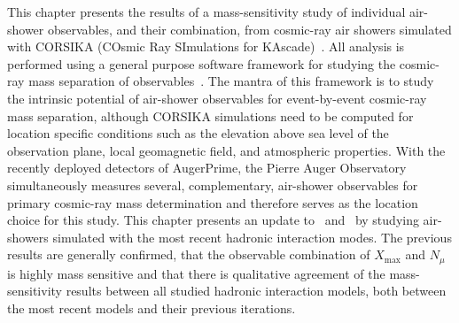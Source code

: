 This chapter presents the results of a mass-sensitivity study of individual air-shower observables, and their combination, from cosmic-ray air showers simulated with CORSIKA (COsmic Ray SImulations for KAscade)~\cite{heck_1998_corsika}.
All analysis is performed using a general purpose software framework for studying the cosmic-ray mass separation of observables~\cite{flaggs_masters2022,flaggs_prd2024_mso,isvhecri2026_flaggs_hadronicmodels}.
The mantra of this framework is to study the intrinsic potential of air-shower observables for event-by-event cosmic-ray mass separation, although CORSIKA simulations need to be computed for location specific conditions such as the elevation above sea level of the observation plane, local geomagnetic field, and atmospheric properties.
With the recently deployed detectors of AugerPrime, the Pierre Auger Observatory simultaneously measures several, complementary, air-shower observables for primary cosmic-ray mass determination and therefore serves as the location choice for this study.
This chapter presents an update to~\cite{flaggs_masters2022} and~\cite{flaggs_prd2024_mso} by studying air-showers simulated with the most recent hadronic interaction modes.
The previous results are generally confirmed, that the observable combination of $X_{\text{max}}$ and $N_{\mu}$ is highly mass sensitive and that there is qualitative agreement of the mass-sensitivity results between all studied hadronic interaction models, both between the most recent models and their previous iterations.









